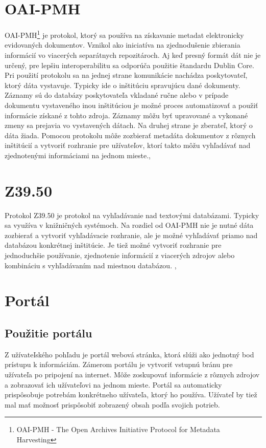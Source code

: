 \documentclass[
  print, %
  table,   %
  lof,     %
  nolot,     %
]{fithesis3}
\begin{document}
\section{OAI-PMH}
OAI-PMH\footnote{OAI-PMH - The Open Archives Initiative Protocol for Metadata Harvesting} je protokol, ktorý sa používa na získavanie metadat elektronicky evidovaných dokumentov. Vznikol ako iniciatíva na zjednodušenie zbierania informácií vo viacerých separátnych repozitároch. Aj keď presný formát dát nie je určený, pre lepšiu interoperabilitu sa odporúča použitie štandardu Dublin Core.\cite{dublin-core} Pri použití protokolu sa na jednej strane komunikácie nachádza poskytovateľ, ktorý dáta vystavuje. Typicky ide o inštitúciu spravujúcu dané dokumenty. Záznamy sú do databázy poskytovateľa vkladané ručne alebo v prípade dokumentu vystaveného inou inštitúciou je možné proces automatizovať a použiť informácie získané z tohto zdroja. Záznamy môžu byť upravované a vykonané zmeny sa prejavia vo vystavených dátach. Na druhej strane je zberateľ, ktorý o dáta žiada. Pomocou protokolu môže zozbierať metadáta dokumentov z rôznych inštitúcií a vytvoriť rozhranie pre užívateľov, ktorí takto môžu vyhľadávať nad zjednotenými informáciami na jednom mieste.\cite{oai1},\cite{oai2}
\section{Z39.50}
Protokol Z39.50 je protokol na vyhľadávanie nad textovými databázami. Typicky sa využíva v knižničných systémoch. Na rozdiel od OAI-PMH nie je nutné dáta zozbierať a vytvoriť vyhľadávacie rozhranie, ale je možné vyhľadávať priamo nad databázou konkrétnej inštitúcie. Je tiež možné vytvoriť rozhranie pre jednoduchšie používanie, zjednotenie informácií z viacerých zdrojov alebo kombináciu s vyhľadávaním nad miestnou databázou. \cite{z39501},\cite{z39502}      
\section{Portál}
\subsection{Použitie portálu}
Z užívateľského pohľadu je portál webová stránka, ktorá slúži ako jednotný bod prístupu k informáciám. Zámerom portálu je vytvoriť vstupnú bránu pre užívateľa po pripojení na internet. Môže zoskupovať informácie z rôznych zdrojov a zobrazovať ich užívateľovi na jednom mieste. Portál sa automaticky prispôsobuje potrebám konkrétneho užívateľa, ktorý ho používa. Užívateľ by tiež mal mať možnosť prispôsobiť zobrazený obsah podľa svojich potrieb.\cite{portal-common1}
\end{document}
